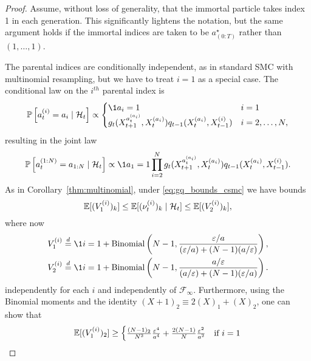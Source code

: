 \begin{proof}
Assume, without loss of generality, that the immortal particle takes index 1 in each generation. This significantly lightens the notation, but the same argument holds if the immortal indices are taken to be $a_{(0:T)}^\star$ rather than $(1,\dots,1)$.

The parental indices are conditionally independent, as in standard SMC with multinomial resampling, but we have to treat $i=1$ as a special case. The conditional law on the $i^{th}$ parental index is
\begin{equation*}
\Prob \left[ a_t^{(i)} = a_i \mid \mathcal{H}_t \right] \propto
\begin{cases}
\1{a_i=1} &i=1 \\
g_t( X_{t+1}^{a_t^{(a_i)}} , X_t^{(a_i)} ) q_{t-1}(X_t^{(a_i)}, X_{t-1}^{(i)}) &i=2,\dots,N ,
\end{cases}
\end{equation*}
resulting in the joint law
\begin{equation*}
\Prob \left[ a_t^{(1:N)} = a_{1:N} \mid \mathcal{H}_t \right] 
\propto \1{a_1 = 1} \prod_{i=2}^N g_t( X_{t+1}^{a_t^{(a_i)}} , X_t^{(a_i)} )  
        q_{t-1}(X_t^{(a_i)}, X_{t-1}^{(i)}).
\end{equation*}
As in Corollary~\ref{thm:multinomial}, under \eqref{eq:gq_bounds_csmc} we have bounds
\begin{equation*}
\mathbb{E}[ (V_1^{(i)})_k ]
\leq \mathbb{E}[ (\nu_t^{(i)})_k \mid \mathcal{H}_t ]
\leq \mathbb{E}[ (V_2^{(i)})_k ] ,
\end{equation*}
where now
\begin{align*}
& V_1^{(i)} 
    \eqdist \1{i=1} + \operatorname{Binomial}\left(N-1, 
        \frac{\varepsilon/a}{(\varepsilon/a) + (N-1)(a/\varepsilon)} \right) , \\
& V_2^{(i)} 
    \eqdist \1{i=1} + \operatorname{Binomial}\left( N-1, 
        \frac{a/\varepsilon}{(a/\varepsilon) + (N-1)(\varepsilon/a)} \right) .
\end{align*}
independently for each $i$ and independently of $\mathcal{F}_\infty$.
Furthermore, using the Binomial moments and the identity $(X+1)_2 \equiv 2(X)_1 +(X)_2$, one can show that
\begin{equation*}
\mathbb{E}[ (V_1^{(i)} )_2 ]
\geq \begin{cases}
\frac{(N-1)_2}{N^2}\frac{\varepsilon^4}{a^4} 
        + \frac{2(N-1)}{N} \frac{\varepsilon^2}{a^2} &\text{if } i=1 \\

\end{cases}
\end{equation*}
\end{proof}

